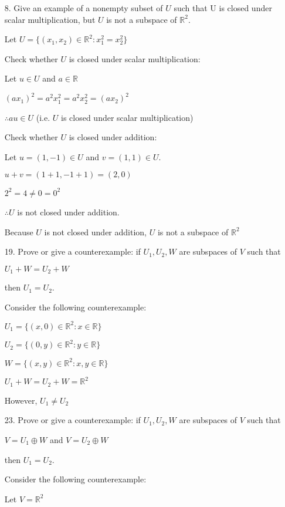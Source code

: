 \documentclass{article}
\begin{document}
\begin{enumerate}[nolistsep]
		\item[8.] Give an example of a nonempty subset of $U$ such that U is closed under scalar multiplication, but $U$ is not a subspace of $\mathbb{R}^2$.
		
		Let $U = \{(x_1, x_2) \in \mathbb{R}^2 : x_1^2 = x_2^2\}$
		
		Check whether $U$ is closed under scalar multiplication:
		
		Let $u \in U$ and $a \in \mathbb{R}$
		
		$(ax_1)^2 = a^2x_1^2 = a^2x_2^2 = (ax_2)^2$
		
		$\therefore au \in U$ (i.e. $U$ is closed under scalar multiplication)
		
		Check whether $U$ is closed under addition:
		
		Let $u = (1, -1) \in U$ and $v = (1, 1) \in U$.
		
		$u + v = (1 + 1, -1 + 1) = (2, 0)$
		
		$2^2 = 4 \neq 0 = 0^2$
		
		$\therefore U$ is not closed under addition.
		
		Because $U$ is not closed under addition, $U$ is not a subspace of $\mathbb{R}^2$
		
		\item[19.] Prove or give a counterexample: if $U_1, U_2, W$ are subspaces of $V$ such that
		
\centerline{$U_1 + W = U_2 + W$}

then $U_1 = U_2$. 
		
		Consider the following counterexample:
		
		$U_1 = \{(x, 0) \in \mathbb{R}^2 : x \in \mathbb{R}\}$
		
		$U_2 = \{(0, y) \in \mathbb{R}^2 : y \in \mathbb{R}\}$
		
		$W = \{(x, y) \in \mathbb{R}^2 : x, y \in \mathbb{R}\}$
		
		$U_1 + W = U_2 + W = \mathbb{R}^2$
		
		However, $U_1 \neq U_2$
		
		\item[23.] Prove or give a counterexample: if $U_1, U_2, W$ are subspaces of $V$ such that
		
		\centerline{$V = U_1 \oplus W$ and $V = U_2 \oplus W$}
		
		then $U_1 = U_2$.
		
		Consider the following counterexample:
		
		Let $V = \mathbb{R}^2$
		

\end{enumerate}
\end{document}
